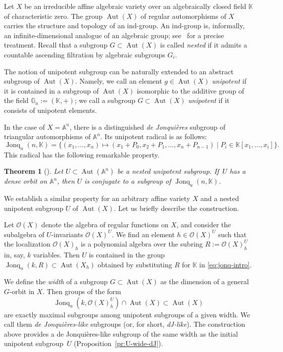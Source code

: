 \documentclass[12pt,a4paper]{amsart}
\theoremstyle{plain}
\newtheorem{theorem}{Theorem}[section]
\theoremstyle{definition}
\theoremstyle{remark}
\def\Aut{\operatorname{Aut}}
\def\AA{{\mathbb A}}
\def\K{{\mathbb K}}
\def\G{{\mathbb G}}
\def\cO{{\mathcal O}}
\DeclareMathOperator{\Jonq}{Jonq}
\begin{document}
Let $X$ be an irreducible affine algebraic variety over an algebraically closed field $\K$ of characteristic zero.
The group $\Aut(X)$ of regular automorphisms of $X$ carries the structure and topology of an ind-group. 
An ind-group is, informally, an infinite-dimensional analogue of an algebraic group; see~\cite{FK} for a precise treatment.
Recall that a subgroup $G \subset \Aut(X)$ is called \emph{nested} if it admits a countable ascending filtration by algebraic subgroups $G_i$. 


The notion of unipotent subgroup can be naturally extended to an abstract subgroup of $\Aut(X)$. Namely, we call an element $g\in\Aut(X)$ \emph{unipotent} if it is contained in a subgroup of $\Aut(X)$ isomorphic to the additive group of the field $\G_a:=(\K,+)$; we call a subgroup $G\subset\Aut(X)$ \emph{unipotent} if it consists of unipotent elements. 


In the case of $X=\AA^n$, there is a distinguished \emph{de Jonqui\`eres} subgroup of triangular automorphisms of $\AA^n$. 
Its unipotent radical is as follows:
\begin{equation}\label{eq:jonq-intro}
   \Jonq_u(n,\K)=\{(x_1,\ldots,x_n)\mapsto (x_1+P_0, x_2+P_1,\ldots,x_n+P_{n-1})\mid P_i\in\K[x_1,\ldots,x_i]\}.   
\end{equation}
This radical has the following remarkable property. 
\begin{theorem}[{\cite[Theorem D]{KZ}}]\label{th:KZ-intro}
   Let $U \subset \Aut(\AA^n)$ be a nested unipotent subgroup. If~$U$ has a dense orbit on $\AA^n$, then $U$ is conjugate to a subgroup of $\Jonq_u(n,\K)$.
\end{theorem}


We establish a similar property for an arbitrary affine variety $X$ and a nested unipotent subgroup $U$ of $\Aut(X)$.
Let us briefly describe the construction. 

Let $\cO(X)$ denote the algebra of regular functions on $X$, and consider the subalgebra of $U$-invariants $\cO(X)^U$.
We find an element $h\in\cO(X)^U$ such that the localization $\cO(X)_h$ is a polynomial algebra over the subring $R:=\cO(X)_h^U$ in, say, $k$ variables. Then $U$ is contained in the group $\Jonq_u(k,R)\subset\Aut(X_h)$ obtained by substituting $R$ for $\K$ in \eqref{eq:jonq-intro}.

We define the \emph{width} of a subgroup $G\subset\Aut(X)$ as the dimension of a general $G$-orbit in $X$.
Then groups of the form 
\[\Jonq_u(k,\cO(X)_h^U)\cap\Aut(X)\subset\Aut(X)\] 
are exactly maximal subgroups among unipotent subgroups of a given width. 
We call them \emph{de Jonqui\`eres-like} subgroups (or, for short, \emph{dJ-like}).
The construction above provides a de Jonqui\`eres-like subgroup of the same width as the initial unipotent subgroup~$U$ (Proposition~\ref{pr:U-wide-dJ}).
\end{document}

